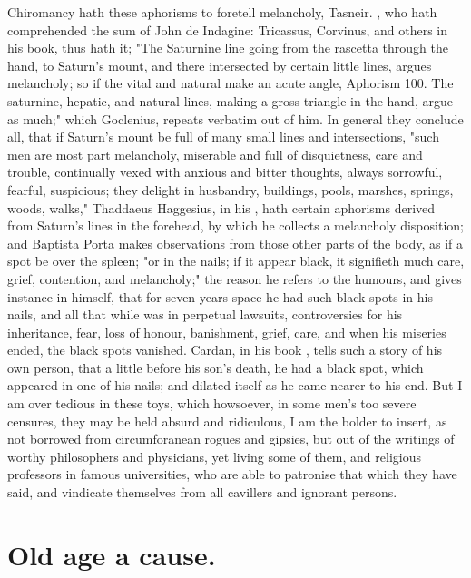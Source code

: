 Chiromancy hath these aphorisms to foretell melancholy, Tasneir.
, who hath comprehended the sum of John de
Indagine: Tricassus, Corvinus, and others in his book, thus hath it;
"The Saturnine line going from the rascetta through the
hand, to Saturn's mount, and there intersected by certain little lines, argues
melancholy; so if the vital and natural make an acute angle, Aphorism 100. The
saturnine, hepatic, and natural lines, making a gross triangle in the hand,
argue as much;" which Goclenius,  repeats
verbatim out of him. In general they conclude all, that if Saturn's mount be
full of many small lines and intersections, "such men are
most part melancholy, miserable and full of disquietness, care and trouble,
continually vexed with anxious and bitter thoughts, always sorrowful, fearful,
suspicious; they delight in husbandry, buildings, pools, marshes, springs,
woods, walks," \etc{} Thaddaeus Haggesius, in his
, hath certain aphorisms derived from
Saturn's lines in the forehead, by which he collects a melancholy disposition;
and Baptista Porta makes observations from those other
parts of the body, as if a spot be over the spleen; "or in
the nails; if it appear black, it signifieth much care, grief, contention, and
melancholy;" the reason he refers to the humours, and gives instance in
himself, that for seven years space he had such black spots in his nails, and
all that while was in perpetual lawsuits, controversies for his inheritance,
fear, loss of honour, banishment, grief, care, \etc{} and when his miseries
ended, the black spots vanished. Cardan, in his book , tells such a story of his own person, that a little before
his son's death, he had a black spot, which appeared in one of his nails; and
dilated itself as he came nearer to his end. But I am over tedious in these
toys, which howsoever, in some men's too severe censures, they may be held
absurd and ridiculous, I am the bolder to insert, as not borrowed from
circumforanean rogues and gipsies, but out of the writings of worthy
philosophers and physicians, yet living some of them, and religious professors
in famous universities, who are able to patronise that which they have said,
and vindicate themselves from all cavillers and ignorant persons.

\section{Old age a cause.}

